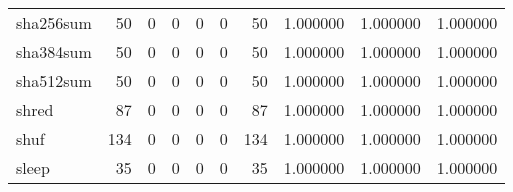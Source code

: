 \begin{tabular}{lrrrrrrrrr}
sha256sum &                                        50 &                                                  0 &                                                  0 &                                                  0 &                                                  0 &                                                 50 &                                           1.000000 &                               1.000000 &                             1.000000 \\
sha384sum &                                        50 &                                                  0 &                                                  0 &                                                  0 &                                                  0 &                                                 50 &                                           1.000000 &                               1.000000 &                             1.000000 \\
sha512sum &                                        50 &                                                  0 &                                                  0 &                                                  0 &                                                  0 &                                                 50 &                                           1.000000 &                               1.000000 &                             1.000000 \\
shred     &                                        87 &                                                  0 &                                                  0 &                                                  0 &                                                  0 &                                                 87 &                                           1.000000 &                               1.000000 &                             1.000000 \\
shuf      &                                       134 &                                                  0 &                                                  0 &                                                  0 &                                                  0 &                                                134 &                                           1.000000 &                               1.000000 &                             1.000000 \\
sleep     &                                        35 &                                                  0 &                                                  0 &                                                  0 &                                                  0 &                                                 35 &                                           1.000000 &                               1.000000 &                             1.000000 \\

\end{tabular}

